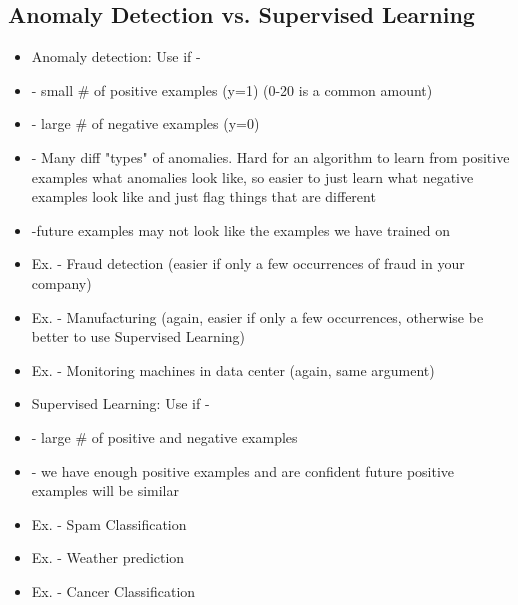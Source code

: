 \documentclass[]{article}
\begin{document}
	\subsection{Anomaly Detection vs. Supervised Learning}
		\begin{itemize}
			\item Anomaly detection: Use if -
			\item - small \# of positive examples (y=1) (0-20 is a common amount)
			\item - large \# of negative examples (y=0)
			\item - Many diff "types" of anomalies. Hard for an algorithm to learn from positive examples what anomalies look like, so easier to just learn what negative examples look like and just flag things that are different
			\item -future examples may not look like the examples we have trained on
			\item Ex. - Fraud detection (easier if only a few occurrences of fraud in your company)
			\item Ex. -  Manufacturing (again, easier if only a few occurrences, otherwise be better to use Supervised Learning)
			\item Ex. - Monitoring machines in data center (again, same argument)
			\item Supervised Learning: Use if -
			\item - large \# of positive and negative examples
			\item - we have enough positive examples and are confident future positive examples will be similar
			\item Ex. - Spam Classification
			\item Ex. - Weather prediction
			\item Ex. - Cancer Classification
		\end{itemize}
		
\end{document}
